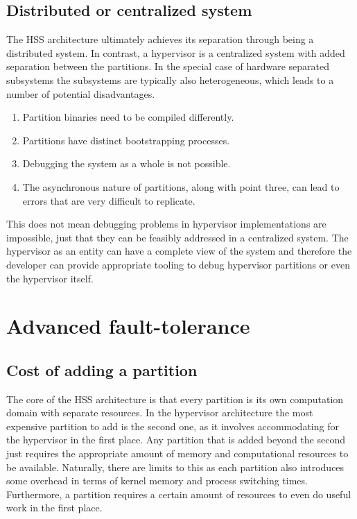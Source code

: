 \subsection{Distributed or centralized system} \label{distributed-or-centralized}
The \gls{HSS} architecture ultimately achieves its separation through being a distributed system. In contrast, a hypervisor is a centralized system with added separation between the partitions. In the special case of hardware separated subsystems the subsystems are typically also heterogeneous, which leads to a number of potential disadvantages.
\begin{enumerate}
\item Partition binaries need to be compiled differently.
\item Partitions have distinct bootstrapping processes.
\item Debugging the system as a whole is not possible.
\item The asynchronous nature of partitions, along with point three, can lead to errors that are very difficult to replicate.
\end{enumerate}
This does not mean debugging problems in hypervisor implementations are impossible, just that they can be feasibly addressed in a centralized system. The hypervisor as an entity can have a complete view of the system and therefore the developer can provide appropriate tooling to debug hypervisor partitions or even the hypervisor itself.

\section{Advanced fault-tolerance} \label{advanced-fault-tolerance}

\subsection{Cost of adding a partition}
The core of the \gls{HSS} architecture is that every partition is its own computation domain with separate resources. In the hypervisor architecture the most expensive partition to add is the second one, as it involves accommodating for the hypervisor in the first place. Any partition that is added beyond the second just requires the appropriate amount of memory and computational resources to be available. Naturally, there are limits to this as each partition also introduces some overhead in terms of kernel memory and process switching times.  Furthermore, a partition requires a certain amount of resources to even do useful work in the first place.


